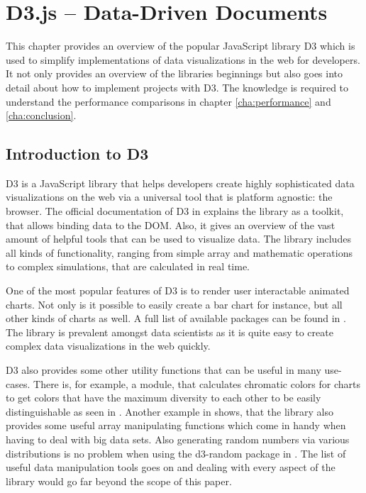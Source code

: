 \chapter{D3.js – Data-Driven Documents}
\label{cha:d3js}

This chapter provides an overview of the popular JavaScript library D3 \cite{D3Website} which is used to simplify implementations of data visualizations in the web for developers. It not only provides an overview of the libraries beginnings but also goes into detail about how to implement projects with D3. The knowledge is required to understand the performance comparisons in chapter \ref{cha:performance} and \ref{cha:conclusion}.


\section{Introduction to D3}

D3 is a JavaScript library that helps developers create highly sophisticated data visualizations on the web via a universal tool that is platform agnostic: the browser. The official documentation of D3 in \cite{D3Website} explains the library as a toolkit, that allows binding data to the DOM. Also, it gives an overview of the vast amount of helpful tools that can be used to visualize data. The library includes all kinds of functionality, ranging from simple array and mathematic operations to complex simulations, that are calculated in real time.

One of the most popular features of D3 is to render user interactable animated charts. Not only is it possible to easily create a bar chart for instance, but all other kinds of charts as well. A full list of available packages can be found in \cite{D3Github}. The library is prevalent amongst data scientists as it is quite easy to create complex data visualizations in the web quickly.

D3 also provides some other utility functions that can be useful in many use-cases. There is, for example, a module, that calculates chromatic colors for charts to get colors that have the maximum diversity to each other to be easily distinguishable as seen in \cite[/d3-scale-chromatic]{D3Github}. Another example in \cite[/d3-array]{D3Github} shows, that the library also provides some useful array manipulating functions which come in handy when having to deal with big data sets. Also generating random numbers via various distributions is no problem when using the d3-random package in \cite[/d3-random]{D3Github}. The list of useful data manipulation tools goes on and dealing with every aspect of the library would go far beyond the scope of this paper. 

